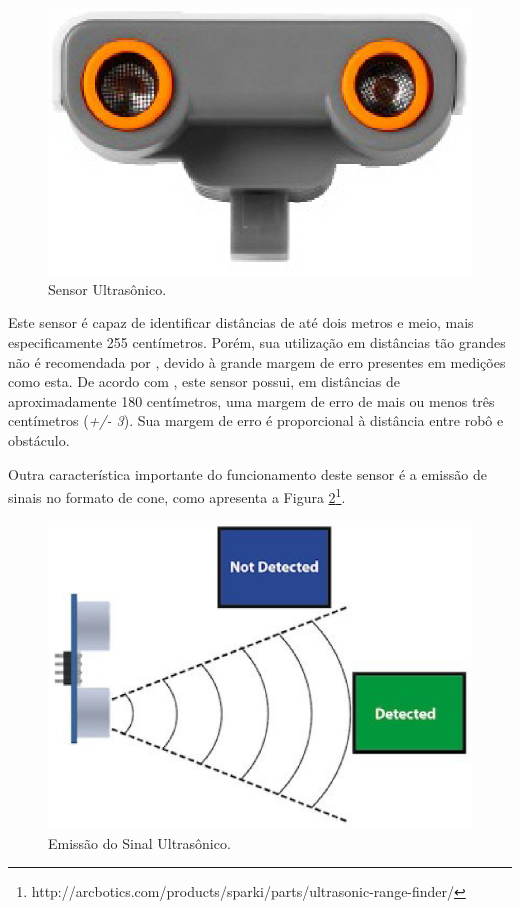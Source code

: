 \begin{itemize}
				\begin{figure}[H]
					\centering
					\includegraphics[scale=0.5]{figuras/ultrasonic.eps}
					\caption{Sensor Ultrasônico.}
					\label{img:ultrasonic}
				\end{figure}

				Este sensor é capaz de identificar distâncias de até dois metros e meio, mais especificamente 255 centímetros. Porém, sua utilização em distâncias tão grandes não é recomendada por \cite{legonxj}, devido à grande margem de erro presentes em medições como esta. De acordo com \cite{legonxj}, este sensor possui, em distâncias de aproximadamente 180 centímetros, uma margem de erro de mais ou menos três centímetros (\textit{+/- 3}). Sua margem de erro é proporcional à distância entre robô e obstáculo.

				Outra característica importante do funcionamento deste sensor é a emissão de sinais no formato de cone, como apresenta a Figura \ref{img:cone2}\footnote{http://arcbotics.com/products/sparki/parts/ultrasonic-range-finder/}.


				\begin{figure}[H]
					\centering
					\includegraphics[scale=0.7]{figuras/cone2.eps}
					\caption{Emissão do Sinal Ultrasônico.}
					\label{img:cone2}
				\end{figure}


\end{itemize}

